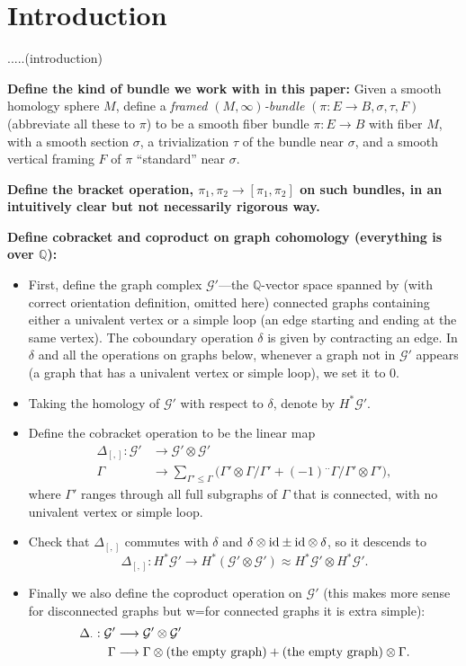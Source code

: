 \documentclass[11pt]{article}
\theoremstyle{definition}
\theoremstyle{remark}
\def\Q{\mathbb{Q}}
\def\cG{\mathcal{G}}
\def\tn#1{\textnormal{#1}}
\begin{document}
\setlength{\parskip}{\baselineskip}
\setlength{\parindent}{0cm}

\section{Introduction}

.....(introduction)

{\bf Define the kind of bundle we work with in this paper:}
Given a smooth homology sphere $M$, define a {\it framed $(M,\infty)$-bundle} $(\pi:E\to B,\sigma, \tau, F)$ (abbreviate all these to $\pi$) to be a smooth fiber bundle $\pi:E\to B$ with fiber $M$, with a smooth section $\sigma$, a trivialization $\tau$ of the bundle near $\sigma$, and a smooth vertical framing $F$ of $\pi$ ``standard'' near $\sigma$. 

{\bf Define the bracket operation, $\pi_1,\pi_2\to[\pi_1,\pi_2]$ on such bundles, in an intuitively clear but not necessarily rigorous way.}

{\bf Define cobracket and coproduct on graph cohomology (everything is over $\Q$):}
\begin{itemize}
\item First, define the graph complex $\cG'$---the $\Q$-vector space spanned by (with correct orientation definition, omitted here) connected graphs containing either a univalent vertex or a simple loop (an edge starting and ending at the same vertex). 
The coboundary operation $\delta$ is given by contracting an edge. 
In $\delta$ and all the operations on graphs below, whenever a graph not in $\cG'$ appears (a graph that has a univalent vertex or simple loop), we set it to 0. 
\item Taking the homology of $\cG'$ with respect to $\delta$, denote by $H^*{\cG'}$. 

\item Define the cobracket operation to be the linear map
\begin{align}\label{graphcobracket_eqn}
\Delta_{[,]}: \cG'&\longrightarrow\cG'\otimes\cG'\nonumber\\
\Gamma&\longrightarrow \sum_{\Gamma'\le\Gamma}\big(\Gamma'\otimes\Gamma/\Gamma'+(-1)^{..}\Gamma/\Gamma'\otimes\Gamma'\big), 
\end{align}
where $\Gamma'$ ranges through all full subgraphs of $\Gamma$ that is connected, with no univalent vertex or simple loop.
\item Check that $\Delta_{[,]}$ commutes with $\delta$ and $\delta\otimes\tn{id}\pm\tn{id}\otimes\delta$, so it descends to 
$$\Delta_{[,]}: H^*{\cG'}\longrightarrow H^*(\cG'\otimes\cG')\approx H^*{\cG'}\otimes H^*{\cG'}.$$

\item Finally we also define the coproduct operation on $\cG'$ (this makes more sense for disconnected graphs but w=for connected graphs it is extra simple):  
\begin{align*}
\Delta_{\cdot}: \cG'&\longrightarrow \cG'\otimes\cG'\\
\Gamma&\longrightarrow \Gamma\otimes \tn{(the empty graph)} + \tn{(the empty graph)}\otimes\Gamma.
\end{align*}

\end{itemize}
\end{document}
